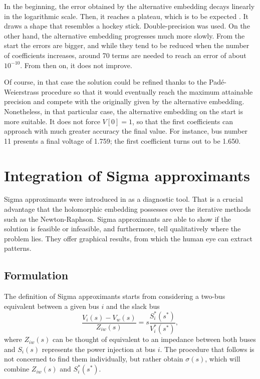 \documentclass[journal]{IEEEtran}
\begin{document}
In the beginning, the error obtained by the alternative embedding decays linearly in the logarithmic scale. Then, it reaches a plateau, which is to be expected \cite{Trias2018}. It draws a shape that resembles a hockey stick. Double-precision was used. On the other hand, the alternative embedding progresses much more slowly. From the start the errors are bigger, and while they tend to be reduced when the number of coefficients increases, around 70 terms are needed to reach an error of about $10^{-10}$. From then on, it does not improve. 

Of course, in that case the solution could be refined thanks to the Padé-Weierstrass procedure \cite{Trias2018} so that it would eventually reach the maximum attainable precision and compete with the originally given by the alternative embedding. 
Nonetheless, in that particular case, the alternative embedding on the start is more suitable. It does not force $V[0]=1$, so that the first coefficients can approach with much greater accuracy the final value. For instance, bus number 11 presents a final voltage of 1.759; the first coefficient turns out to be 1.650. 


\section{Integration of Sigma approximants} \label{sec3}
Sigma approximants were introduced in \cite{Trias_sigma} as a diagnostic tool. That is a crucial advantage that the holomorphic embedding possesses over the iterative methods such as the Newton-Raphson. Sigma approximants are able to show if the solution is feasible or infeasible, and furthermore, tell qualitatively where the problem lies. They offer graphical results, from which the human eye can extract patterns. 

\subsection{Formulation}
The definition of Sigma approximants starts from considering a two-bus equivalent between a given bus $i$ and the slack bus
\begin{equation}
  \frac{V_i(s)-V_w(s)}{Z_{iw}(s)}=s\frac{S^*_i(s^*)}{V^*_i(s^*)},
  \label{s1}
\end{equation}
where $Z_{iw}(s)$ can be thought of equivalent to an impedance between both buses and $S_i(s)$ represents the power injection at bus $i$. The procedure that follows is not concerned to find them individually, but rather obtain $\sigma(s)$, which will combine $Z_{iw}(s)$ and $S^*_i(s^*)$.
\end{document}
